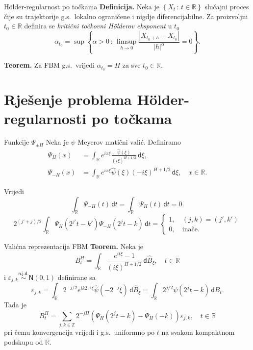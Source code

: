 \documentclass{beamer}
\renewcommand{\mathrm}[1]{\mathsf{#1}}
\newcommand{\st}{\, \colon \,}
\newcommand{\D}{\,\mathrm d}
\newcommand{\wh}[1]{\widehat{#1}}
\newcommand{\R}{\mathbb{R}}
\newcommand{\Z}{\mathbb{Z}}
\newcommand{\holder}{H\" older}
\newcommand{\abs}[1]{\left| {#1} \right|}
\begin{document}
\begin{frame}{\holder -regularnost po točkama}
	\textbf{Definicija.}
	Neka je \( \left\{ X_t \st t \in \R\right\} \) slučajni proces čije su trajektorije g.s.\
	lokalno ograničene i nigdje diferencijabilne. Za proizvoljni
	\( t_0 \in \R \) definira se \emph{kritični točkovni \holder ov eksponent} u \( t_0 \)
	\begin{equation}
		\alpha_{t_0} = \sup \left\{ \alpha > 0 \st
		\limsup\limits_{h \rightarrow 0} \frac{\abs{X_{t_0+h}-X_{t_0}}}{\abs h^\alpha} = 0
		\right\}.
	\end{equation}

	\vskip20pt
	\textbf{Teorem.} Za FBM g.s.\ vrijedi \( \alpha_{t_0} = H \) za sve \( t_0 \in \R \).

\end{frame}

\section{Rješenje problema \holder -regularnosti po točkama}
\begin{frame}{Funkcije \( \Psi_{\pm H} \)}
	Neka je \( \psi \) Meyerov matični valić. Definiramo
	\begin{align}
		\Psi_H(x)    & = \int_\R
		e^{ix\xi} \frac{\wh \psi(\xi)}{(i\xi)^{H+1/2}} \D \xi, \\
		\Psi_{-H}(x) & = \int_\R e^{ix\xi} \wh \psi(\xi)
		(-i\xi)^{H+1/2} \D \xi, \quad x \in \R.
	\end{align}

	\vskip20pt
	Vrijedi
	\begin{equation}
		\int_\R \Psi_{-H}(t) \D t = \int_\R \Psi_H(t) \D t = 0.
	\end{equation}
	\begin{equation}\label{eq:intpsihpsi-h}
		2^{(j'+j)/2}\int_\R \Psi_H(2^{j'}t-k')\Psi_{-H}(2^jt-k) \D t =
		\begin{cases}
			1, \  & (j,k)=(j',k') \\
			0, \  & \text{inače}.
		\end{cases}
	\end{equation}
\end{frame}

\begin{frame}{Valićna reprezentacija FBM}
	\textbf{Teorem.} Neka je
	\begin{equation}
		B_t^H = \int_\R \frac{e^{it\xi}-1}{(i\xi)^{H+1/2}} \D \wh B_\xi, \quad t \in \R
	\end{equation}
	i \( \varepsilon_{j,k} \stackrel{\mathrm{n.j.d.}}{\sim} \mathrm N(0,1) \) definirane sa
	\begin{equation}
		\varepsilon_{j,k} =
		\int_\R 2^{-j/2}e^{ik2^{-j}\xi}\wh \psi(-2^{-j}\xi)\D \wh B_\xi =
		\int_\R 2^{j/2} \psi(2^jt-k) \D B_t.
	\end{equation}
	Tada je
	\begin{equation}\label{eq:valfbmrep}
		B^H_t = \sum_{j,k \in \Z}
		2^{-jH} \left( \Psi_H(2^jt - k) - \Psi_H(-k)  \right) \varepsilon_{j,k}, \quad t \in \R
	\end{equation}
	pri čemu konvergencija vrijedi i g.s.\ uniformno po \( t \) na svakom
	kompaktnom podskupu od \( \R \).
\end{frame}
\end{document}
